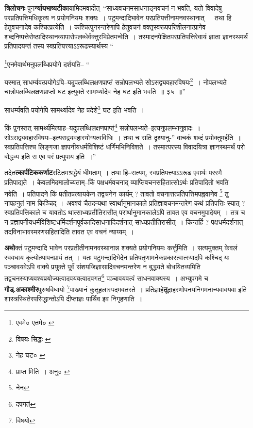 \documentclass[article,12pt,a4paper]{memoir}
\begin{document}
	  \pstart \textbf{त्रिलोचनः} पुन\textbf{र्न्यायभाष्यटीका}यामिदमवादीत्--“साध्यवचनमसाधनाङ्गवचनं न भवति, यतो विवादेषु परप्रतिपत्तिमधिकृत्य न प्रयोगनियमः शक्यः । पटुमन्दादिभावेन परप्रतिपत्तीनामनवस्थानात् । तथा हि हेतुवचनादेव कश्चित्प्रत्येति । कश्चित्पुनरन्तरेणापि हेतुवचनं वक्तृस्वरूपपरिशीलनात्प्रागेव शब्दनिष्पत्तेरोष्ठादिस्थानव्यापारोपलब्धेर्वक्तुरभिप्रेतमन्वेति । तस्मादनपेक्षितपरप्रतिपत्तिरेवायं ज्ञाता ज्ञानस्थमर्थं प्रतिपादयन्तं तस्य स्वप्रतिपत्त्याऽऽरूढस्यार्थस्य \leavevmode{} “
	  
	\footnote{एवमे० \cite{dp-msA} \cite{dp-msB} \cite{dp-edP} \cite{dp-edH} \cite{dp-edE} एतमे० \cite{dp-edN}}एनमेवार्थमनुपलब्धिप्रयोगे दर्शयति-- “
	  
	यस्मात् साधर्म्यवत्प्रयोगेऽपि--यदुपलब्धिलक्षणप्राप्तं सन्नोपलभ्यते सोऽसद्व्यवहारविषयः\footnote{विषयः सिद्धः \cite{dp-msC}} । नोपलभ्यते चात्रोपलब्धिलक्षणप्राप्तो घट इत्युक्ते सामर्थ्यादेव नेह घट इति भवति ॥ ३५ ॥” 
	  
	साधर्म्यवति प्रयोगेपि सामर्थ्यादेव नेह प्रदेशे\footnote{नेह घट० \cite{dp-msA} \cite{dp-msB} \cite{dp-edP} \cite{dp-edH} \cite{dp-edN}} घट इति भवति । 
	  
	किं पुनस्तत् सामर्थ्यमित्याह--यदुपलब्धिलक्षणप्राप्तं\footnote{प्राप्त मिति । अनु० \cite{dp-msA} \cite{dp-edP} \cite{dp-edH}} सन्नोपलभ्यते--इत्यनुपलम्भानुवादः । सोऽसद्व्यवहारविषयः--इत्यसद्व्यवहारयोग्यत्वविधिः । तथा च सति दृश्यानु-” वाचकं शब्दं प्रयोक्तुमर्हति । स्वप्रतिपत्तिश्च लिङ्गजा ज्ञापनीयधर्मविशिष्टं धर्णिमभिनिविशते । तस्मात्परस्य विवादयित्रा ज्ञानस्थमर्थं परो बोद्धव्य इति स एव परं प्रत्युपाय इति ।”
	\pend
      

	  \pstart तदेत\textbf{त्कार्पटिककर्णाट}रटितमश्रद्धेयं धीमताम् । तथा हि--सत्यम्, स्वप्रतिपत्त्याऽऽरूढ एवार्थः परस्मै प्रतिपाद्यते । केवलमिदमालोच्यताम्--किं पक्षधर्मवचनाद् व्याप्तिवचनसहितात्सोऽर्थः प्रतिपादितो भवति नवेति । प्रतिपादने किं प्रतीतप्रत्यायकेन तद्वचनेन कार्यम् ? तावतो वचनात्तत्प्रतिपत्तिमपह्नवानेव \footnote{नेन} तु नापहनुतं नाम किञ्चिद् । अवश्यं चैतदन्यथा स्वार्थानुमानकाले प्रतिज्ञावचनमन्तरेण कथं प्रतिपत्तिः स्यात् ? स्वप्रतिपत्तिकाले च यावतोऽ थात्साध्यप्रतीतिरासीत् परार्थानुमानकालेऽपि तावत एव वचनमुपादेयम् । तत्र च न प्रज्ञापनीयधर्मविशिष्टधर्मिदर्शनपूर्वकादिसाधनादिदर्शनात् साध्यप्रतीतिरासीत् । किन्तर्हि ? पक्षधर्मदर्शनात् तदविनाभावस्मरणसहितादिति तावत एव वचनं न्याय्यम् ।
	\pend
      

	  \pstart \textbf{अथो}क्तं पटुमन्दादि भावेन परप्रतीतीनामनवस्थानान्न शक्यते प्रयोगनियमः कर्त्तुमिति । सत्यमुक्तम्\leavevmode{} केवलं स्ववधाय कृत्योत्थापनप्रायं तत् । यतः पटुमन्दादिभेदेन प्रतिपतृणामनेकप्रकारत्वात्स्यादपि कश्चिद् यः पञ्चावयवेऽपि वाक्ये प्रयुक्ते पूर्वं संशयजिज्ञासादिवचनमन्तरेण न बुद्ध्यते बोधयितव्यमिति तद्वचनस्याप्यवश्यप्रयोज्यत्वादवयवत्वादवगत\footnote{दपगतं} पञ्चावयवत्वं साधनवाक्यस्य । अभ्युपगमे च \textbf{गौड्.अकाश्मीर}पुरुषविधायो \footnote{विषयो}पाख्यानं कुतूहलास्पदमवतरते । प्रतिज्ञाहे\textbf{तू}दाहरणोपनयनिगमनान्यवावयवा इति शास्त्रस्थितेरपसिद्धान्तोऽपि दीप्ताज्ञः पार्थिव इव निगृहणाति ।
	\pend
      
\end{document}
